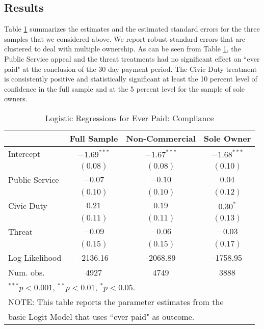 \documentclass[12pt,titlepage]{article}
\begin{document}
\subsection{Results}
  
Table \ref{XX} summarizes the estimates and the estimated standard
errors for the three samples that we considered above. We report
robust standard errors that are clustered to deal with multiple
ownership. As can be seen from Table \ref{XX}, the Public Service appeal and
the threat treatments had no significant effect on ``ever paid" at the
conclusion of the 30 day payment period.  The Civic Duty treatment is
consistently positive and statistically significant at least the 10
percent level of confidence in the full sample and at the 5
percent level for the sample of sole owners.

\begin{table}[htbp]
\caption{Logistic Regressions for Ever Paid: Compliance}\label{XX}
\begin{center}
\begin{tabular}{| l |  c | c | c |}
\hline
               & Full Sample & Non-Commercial & Sole Owner \\
\hline
Intercept      & $-1.69^{***}$ & $-1.67^{***}$ & $-1.68^{***}$ \\
               & $(0.08)$      & $(0.08)$      & $(0.10)$      \\
Public Service          & $-0.07$       & $-0.10$       & $0.04$        \\
               & $(0.10)$      & $(0.10)$      & $(0.12)$      \\
Civic Duty           & $0.21$        & $0.19$        & $0.30^{*}$    \\
               & $(0.11)$      & $(0.11)$      & $(0.13)$      \\
Threat         & $-0.09$       & $-0.06$       & $-0.03$       \\
               & $(0.15)$      & $(0.15)$      & $(0.17)$      \\
\hline
Log Likelihood & -2136.16      & -2068.89      & -1758.95      \\
Num. obs.      & 4927          & 4749          & 3888          \\
\hline
\multicolumn{4}{l}{$^{***}p<0.001$, $^{**}p<0.01$, $^*p<0.05$.} \\
\multicolumn{4}{l}{NOTE: This table reports the parameter estimates from the} \\
\multicolumn{4}{l}{basic Logit Model that uses ``ever paid" as outcome.}
\end{tabular}
\end{center}
\end{table}
\end{document}
